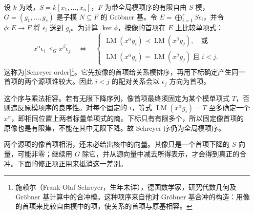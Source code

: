 设 \(k\) 为域，\(S=k[x_1,\ldots,x_n]\)，\(F\) 为带全局模项序的有限自由 \(S\) 模，\(G=(g_1,\ldots,g_s)\) 是子模 \(N\subseteq F\) 的 Gröbner 基。令 \(E=\bigoplus_{i=1}^sS\epsilon_i\)，并令 \(\phi:E\rightarrow F\) 将 \(\epsilon_i\) 送到 \(g_i\)。为计算 \(\ker\phi\)，按像的首项在 \(E\) 上比较单项式：
\[
	x^\alpha\epsilon_i\prec_G x^\beta\epsilon_j \quad\Longleftrightarrow\quad
	\begin{cases}
		\operatorname{LM}(x^\alpha g_i)\prec\operatorname{LM}(x^\beta g_j),\quad\text{或}\\
		\operatorname{LM}(x^\alpha g_i)=\operatorname{LM}(x^\beta g_j)\;\text{且}\;i<j.
	\end{cases}
\]
这称为[Schreyer order]\footnote{施赖尔（Frank-Olaf Schreyer，生年未详），德国数学家，研究代数几何及 Gröbner 基计算中的合冲模。这种项序来自他对 Gröbner 基合冲的构造：用像的首项来比较自由模中的项，使关系的首项与原基相容。}。它先按像的首项给关系模排序，再用下标确定产生同一首项的两个源项谁较大。因此 \(i<j\) 的配对关系会以 \(\epsilon_j\) 方向为首项。

\ProseParagraphBreak
这个序与乘法相容。若有无限下降序列，像首项最终须固定为某个模单项式 \(T\)，否则违反原模项序的良序性。对每个固定的 \(i\)，等式 \(\operatorname{LM}(x^\alpha g_i)=T\) 至多确定一个 \(x^\alpha\)，即相同位置上两者标量单项式的商。下标只有有限多个，所以固定像首项的原像也是有限集，不能在其中无限下降。故 Schreyer 序仍为全局模项序。

\ProseParagraphBreak
两个源项的像首项相消，还未必给出核中的向量。其像只是一个首项下降的 \(S\)-向量，可能非零；继续用 \(G\) 除它，并从源向量中减去所得表示，才会得到真正的合冲。下面的修正项正用来抵消这一差别。

